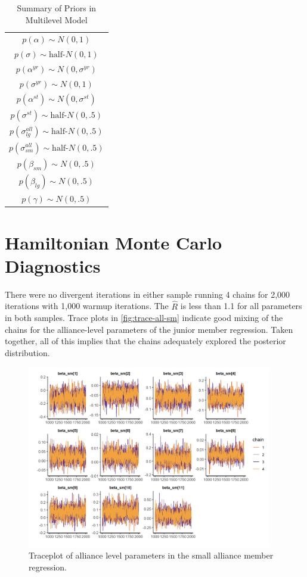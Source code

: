 \documentclass[12pt]{article}
\begin{document}
\begin{table} %
\begin{center}
\begin{tabular}{c} 
$ p(\alpha) \sim N(0, 1)$  \\
$ p(\sigma) \sim \mbox{half-}N(0, 1) $ \\
$ p(\alpha^{yr}) \sim N(0, \sigma^{yr}) $ \\ 
$ p(\sigma^{yr}) \sim N(0, 1) $ \\
$ p(\alpha^{st}) \sim N(0, \sigma^{st}) $ \\ 
$ p(\sigma^{st}) \sim \mbox{half-}N(0, .5) $ \\ 
$ p(\sigma^{all}_{lg}) \sim \mbox{half-}N(0, .5) $ \\
$ p(\sigma^{all}_{sm}) \sim \mbox{half-}N(0, .5) $ \\
$ p(\beta_{sm}) \sim N(0, .5) $ \\
$ p(\beta_{lg}) \sim N(0, .5) $ \\
$ p(\gamma) \sim N(0, .5) $ 
\end{tabular} 
\caption{Summary of Priors in Multilevel Model} 
\label{tab:priors}
\end{center} 
\end{table} 


\section{Hamiltonian Monte Carlo Diagnostics}

There were no divergent iterations in either sample running 4 chains for 2,000 iterations with 1,000 warmup iterations. 
The $\hat{R}$ is less than 1.1 for all parameters in both samples. 
Trace plots in \autoref{fig:trace-all-sm} indicate good mixing of the chains for the alliance-level parameters of the junior member regression. 
Taken together, all of this implies that the chains adequately explored the posterior distribution. 

\begin{figure}[htbp]
	\centering
		\includegraphics[width=0.95\textwidth]{trace-all-sm.png}
	\caption{Traceplot of alliance level parameters in the small alliance member regression.}
	\label{fig:trace-all-sm}
\end{figure}
\end{document}
